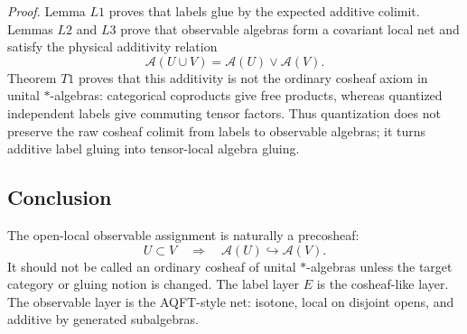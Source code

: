 \emph{Proof.}
Lemma \(L1\) proves that labels glue by the expected additive colimit.  Lemmas
\(L2\) and \(L3\) prove that observable algebras form a covariant local net
and satisfy the physical additivity relation
\[
  \mathcal A(U\cup V)=\mathcal A(U)\vee\mathcal A(V).
\]
Theorem \(T1\) proves that this additivity is not the ordinary cosheaf axiom
in unital \(*\)-algebras: categorical coproducts give free products, whereas
quantized independent labels give commuting tensor factors.  Thus quantization
does not preserve the raw cosheaf colimit from labels to observable algebras;
it turns additive label gluing into tensor-local algebra gluing.

\subsection{Conclusion}

The open-local observable assignment is naturally a precosheaf:
\[
  U\subset V\quad\Rightarrow\quad
  \mathcal A(U)\hookrightarrow\mathcal A(V).
\]
It should not be called an ordinary cosheaf of unital \(*\)-algebras unless the
target category or gluing notion is changed.  The label layer \(E\) is the
cosheaf-like layer.  The observable layer is the AQFT-style net: isotone,
local on disjoint opens, and additive by generated subalgebras.
